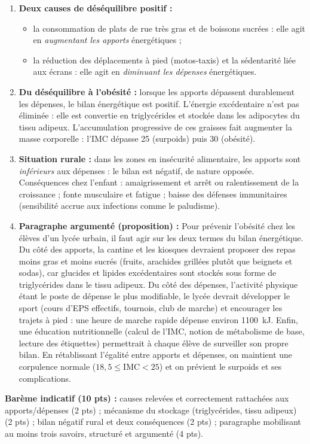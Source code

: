 \documentclass[11pt]{article}
\newcommand{\cle}[1]{{\popxbold\color{popdark}#1}}
\begin{document}
\begin{corrige}
\tcblower
\begin{enumerate}
\item \textbf{Deux causes de déséquilibre positif :}
\begin{itemize}
\item la consommation de plats de rue très gras et de boissons sucrées : elle agit en \emph{augmentant les apports} énergétiques ;
\item la réduction des déplacements à pied (motos-taxis) et la sédentarité liée aux écrans : elle agit en \emph{diminuant les dépenses} énergétiques.
\end{itemize}
\item \textbf{Du déséquilibre à l'obésité :} lorsque les apports dépassent durablement les dépenses, le bilan énergétique est positif. L'énergie excédentaire n'est pas éliminée : elle est convertie en \cle{triglycérides} et stockée dans les adipocytes du tissu adipeux. L'accumulation progressive de ces graisses fait augmenter la masse corporelle : l'IMC dépasse 25 (surpoids) puis 30 (obésité).
\item \textbf{Situation rurale :} dans les zones en insécurité alimentaire, les apports sont \emph{inférieurs} aux dépenses : le bilan est négatif, de nature opposée. Conséquences chez l'enfant : amaigrissement et arrêt ou ralentissement de la croissance ; fonte musculaire et fatigue ; baisse des défenses immunitaires (sensibilité accrue aux infections comme le paludisme).
\item \textbf{Paragraphe argumenté (proposition) :} Pour prévenir l'obésité chez les élèves d'un lycée urbain, il faut agir sur les deux termes du bilan énergétique. Du côté des apports, la cantine et les kiosques devraient proposer des repas moins gras et moins sucrés (fruits, arachides grillées plutôt que beignets et sodas), car glucides et lipides excédentaires sont stockés sous forme de triglycérides dans le tissu adipeux. Du côté des dépenses, l'activité physique étant le poste de dépense le plus modifiable, le lycée devrait développer le sport (cours d'EPS effectifs, tournois, club de marche) et encourager les trajets à pied : une heure de marche rapide dépense environ \SI{1100}{kJ}. Enfin, une éducation nutritionnelle (calcul de l'IMC, notion de métabolisme de base, lecture des étiquettes) permettrait à chaque élève de surveiller son propre bilan. En rétablissant l'égalité entre apports et dépenses, on maintient une corpulence normale ($18,5 \leq \mathrm{IMC} < 25$) et on prévient le surpoids et ses complications.
\end{enumerate}
\textbf{Barème indicatif (10 pts) :} causes relevées et correctement rattachées aux apports/dépenses (2 pts) ; mécanisme du stockage (triglycérides, tissu adipeux) (2 pts) ; bilan négatif rural et deux conséquences (2 pts) ; paragraphe mobilisant au moins trois savoirs, structuré et argumenté (4 pts).


\end{corrige}
\end{document}
